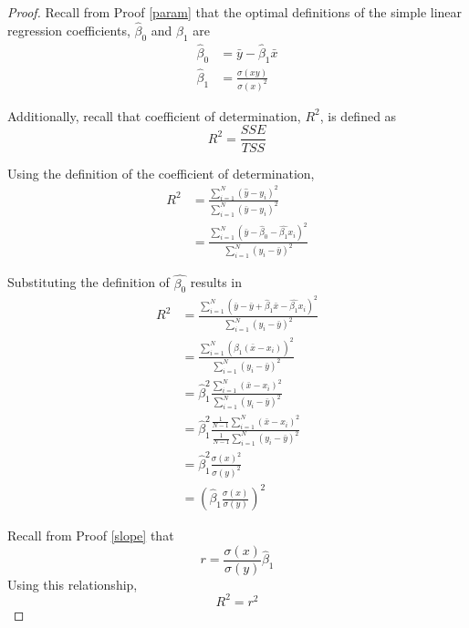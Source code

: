 \begin{proof}

Recall from Proof \ref{param} that the optimal definitions of the simple linear regression coefficients, $\hat{\beta}_0$ and $\hat{\beta}_1$ are
\begin{align*}
\hat{\beta}_0   &= \bar{y}-\hat{\beta}_1\bar{x} \\
\hat{\beta}_1   &= \frac{\sigma(xy)}{\sigma(x)^2}
\end{align*}

Additionally, recall that coefficient of determination, $R^2$, is defined as
\[R^2=\frac{SSE}{TSS}\]

Using the definition of the coefficient of determination,
\begin{align*}
R^2 &= \frac{\sum_{i=1}^{N}(\hat{y}-y_i)^2}{\sum_{i=1}^{N}(\bar{y}-y_i)^2} \\
    &= \frac{\sum_{i=1}^{N}(\bar{y}-\hat{\beta}_0-\hat{\beta_1}x_i)^2}{\sum_{i=1}^{N}(y_i-\bar{y})^2}
\end{align*}

Substituting the definition of $\hat{\beta_0}$ results in
\begin{align*}
R^2 &= \frac{\sum_{i=1}^{N}(\bar{y}-\bar{y}+\hat{\beta}_1\bar{x}-\hat{\beta_1}x_i)^2}{\sum_{i=1}^{N}(y_i-\bar{y})^2} \\
    &= \frac{\sum_{i=1}^{N}(\hat{\beta_1}(\bar{x}-x_i))^2}{\sum_{i=1}^{N}(y_i-\bar{y})^2} \\
    &= \hat{\beta}_1^2\frac{\sum_{i=1}^{N}(\bar{x}-x_i)^2}{\sum_{i=1}^{N}(y_i-\bar{y})^2} \\
    &= \hat{\beta}_1^2\frac{\frac{1}{N-1}\sum_{i=1}^{N}(\bar{x}-x_i)^2}{\frac{1}{N-1}\sum_{i=1}^{N}(y_i-\bar{y})^2} \\
    &= \hat{\beta}_1^2\frac{\sigma(x)^2}{\sigma(y)^2} \\
    &= \left(\hat{\beta}_1\frac{\sigma(x)}{\sigma(y)}\right)^2
\end{align*}

Recall from Proof \ref{slope} that
\[r=\frac{\sigma(x)}{\sigma(y)}\hat{\beta}_1\]
Using this relationship,
\[R^2=r^2\]
\end{proof}